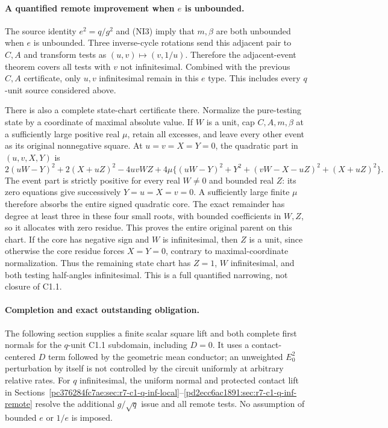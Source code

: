\paragraph{A quantified remote improvement when $e$ is unbounded.}
The source identity $e^2=q/g^2$ and (NI3) imply that $m,\beta$ are
both unbounded when $e$ is unbounded. Three inverse-cycle rotations
send this adjacent pair to $C,A$ and transform tests as
$(u,v)\mapsto(v,1/u)$. Therefore the adjacent-event theorem covers
all tests with $v$ not infinitesimal. Combined with the previous
$C,A$ certificate, only $u,v$ infinitesimal remain in this $e$ type.
This includes every $q$-unit source considered above.

There is also a complete state-chart certificate there. Normalize the
pure-testing state by a coordinate of maximal absolute value. If
$W$ is a unit, cap $C,A,m,\beta$ at a sufficiently large positive
real $\mu$, retain all excesses, and leave every other event as its
original nonnegative square. At $u=v=X=Y=0$, the quadratic part in
$(u,v,X,Y)$ is
\[
 2(uW-Y)^2+2(X+uZ)^2-4uvWZ+
 4\mu\{(uW-Y)^2+Y^2+(vW-X-uZ)^2+(X+uZ)^2\}.
 \tag{SC8}
\]
The event part is strictly positive for every real $W\ne0$ and bounded
real $Z$: its zero equations give successively $Y=u=X=v=0$. A sufficiently
large finite $\mu$ therefore absorbs the entire signed quadratic core.
The exact remainder has degree at least three in these four small
roots, with bounded coefficients in $W,Z$, so it allocates with zero
residue. This proves the entire original parent on this chart.
If the core has negative sign and $W$ is infinitesimal, then $Z$ is
a unit, since otherwise the core residue forces $X=Y=0$, contrary
to maximal-coordinate normalization. Thus the remaining state chart
has $Z=1$, $W$ infinitesimal, and both testing half-angles infinitesimal.
This is a full quantified narrowing, not closure of C1.1.

\paragraph{Completion and exact outstanding obligation.}
The following section supplies a finite scalar square lift and both
complete first normals for the $q$-unit C1.1 subdomain, including
$D=0$. It uses a contact-centered $D$ term followed by the geometric
mean conductor; an unweighted $E_0^2$ perturbation by itself is not
controlled by the circuit uniformly at arbitrary relative rates.
For $q$ infinitesimal, the uniform normal and protected contact lift
in Sections~\ref{pc376284fc7ae:sec:r7-c1-q-inf-local}--\ref{pd2ecc6ac1891:sec:r7-c1-q-inf-remote}
resolve the additional $g/\sqrt q$ issue and all remote tests.
No assumption of bounded $e$ or $1/e$ is imposed. 



